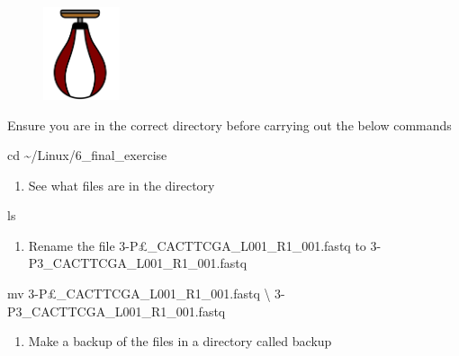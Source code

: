 \documentclass[
  letterpaper,
  DIV=11,
  numbers=noendperiod]{scrreprt}
\newenvironment{Shaded}{\begin{snugshade}}{\end{snugshade}}
\newcommand{\BuiltInTok}[1]{\textcolor[rgb]{0.00,0.23,0.31}{#1}}
\newcommand{\DataTypeTok}[1]{\textcolor[rgb]{0.68,0.00,0.00}{#1}}
\newcommand{\FunctionTok}[1]{\textcolor[rgb]{0.28,0.35,0.67}{#1}}
\newcommand{\NormalTok}[1]{\textcolor[rgb]{0.00,0.23,0.31}{#1}}
\providecommand{\tightlist}{%
  \setlength{\itemsep}{0pt}\setlength{\parskip}{0pt}}\usepackage{longtable,booktabs,array}
\begin{document}
\begin{figure}

{\centering \includegraphics[width=0.2\textwidth,height=\textheight]{figures/exercise_2.png}

}

\end{figure}

Ensure you are in the correct directory before carrying out the below
commands

\begin{Shaded}
\begin{Highlighting}[]
\BuiltInTok{cd}\NormalTok{ \textasciitilde{}/Linux/6\_final\_exercise}
\end{Highlighting}
\end{Shaded}

\begin{enumerate}
\def\labelenumi{\arabic{enumi}.}
\tightlist
\item
  See what files are in the directory
\end{enumerate}

\begin{Shaded}
\begin{Highlighting}[]
\FunctionTok{ls}
\end{Highlighting}
\end{Shaded}

\begin{enumerate}
\def\labelenumi{\arabic{enumi}.}
\setcounter{enumi}{1}
\tightlist
\item
  Rename the file 3-P£\_CACTTCGA\_L001\_R1\_001.fastq to
  3-P3\_CACTTCGA\_L001\_R1\_001.fastq
\end{enumerate}

\begin{Shaded}
\begin{Highlighting}[]
\FunctionTok{mv}\NormalTok{ 3{-}P£\_CACTTCGA\_L001\_R1\_001.fastq }\DataTypeTok{\textbackslash{}}
\NormalTok{3{-}P3\_CACTTCGA\_L001\_R1\_001.fastq}
\end{Highlighting}
\end{Shaded}

\begin{enumerate}
\def\labelenumi{\arabic{enumi}.}
\setcounter{enumi}{2}
\tightlist
\item
  Make a backup of the files in a directory called backup
\end{enumerate}
\end{document}
